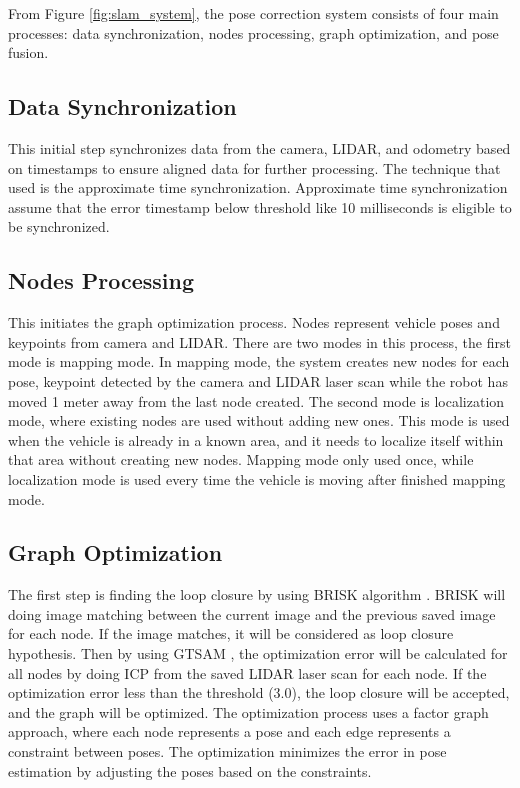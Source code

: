 From Figure \ref{fig:slam_system}, the pose correction system consists of four main processes: data synchronization, nodes processing, graph optimization, and pose fusion.

\subsection{Data Synchronization} 
This initial step synchronizes data from the camera, LIDAR, and odometry based on timestamps to ensure aligned data for further processing. The technique that used is the approximate time synchronization. Approximate time synchronization assume that the error timestamp below threshold like 10 milliseconds is eligible to be synchronized. 

\subsection{Nodes Processing}
This initiates the graph optimization process. Nodes represent vehicle poses and keypoints from camera and LIDAR. There are two modes in this process, the first mode is mapping mode. In mapping mode, the system creates new nodes for each pose, keypoint detected by the camera and LIDAR laser scan while the robot has moved 1 meter away from the last node created. The second mode is localization mode, where existing nodes are used without adding new ones. This mode is used when the vehicle is already in a known area, and it needs to localize itself within that area without creating new nodes. Mapping mode only used once, while localization mode is used every time the vehicle is moving after finished mapping mode.

\subsection{Graph Optimization} 
The first step is finding the loop closure by using BRISK algorithm \cite{ref_brisk}. BRISK will doing image matching between the current image and the previous saved image for each node. If the image matches, it will be considered as loop closure hypothesis. Then by using GTSAM \cite{ref_gtsam}, the optimization error will be calculated for all nodes by doing ICP \cite{ref_icp} from the saved LIDAR laser scan for each node. If the optimization error less than the threshold (3.0), the loop closure will be accepted, and the graph will be optimized. The optimization process uses a factor graph approach, where each node represents a pose and each edge represents a constraint between poses. The optimization minimizes the error in pose estimation by adjusting the poses based on the constraints.

